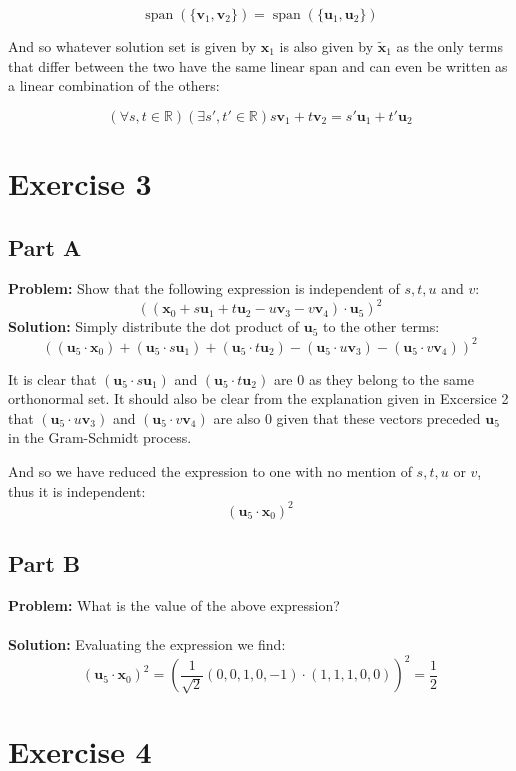 \documentclass{article}
\begin{document}
$$\operatorname{span}(\{\mathbf v_1,\mathbf v_2\})=\operatorname{span}(\{\mathbf u_1,\mathbf u_2\})$$

And so whatever solution set is given by $\mathbf x_1$ is also given by $\tilde{\mathbf x}_1$ as the only terms that differ between the two have the same linear span and can even be written as a linear combination of the others:

$$\left(\forall s,t\in\mathbb R\right)\left(\exists s',t'\in\mathbb R\right)s\mathbf v_1+t\mathbf v_2=s'\mathbf u_1+t'\mathbf u_2$$

\section*{Exercise 3}
\subsection*{Part A}
\textbf{Problem:} Show that the following expression is independent of $s,t,u$ and $v$:
$$((\mathbf x_0+s\mathbf u_1+t\mathbf u_2-u\mathbf v_3-v\mathbf v_4)\cdot\mathbf u_5)^2$$
\textbf{Solution:} Simply distribute the dot product of $\mathbf u_5$ to the other terms:
$$((\mathbf u_5\cdot\mathbf x_0)+(\mathbf u_5\cdot s\mathbf u_1)+(\mathbf u_5\cdot t\mathbf u_2)-(\mathbf u_5\cdot u\mathbf v_3)-(\mathbf u_5\cdot v\mathbf v_4))^2$$

It is clear that $(\mathbf u_5\cdot s\mathbf u_1)$ and $(\mathbf u_5\cdot t\mathbf u_2)$ are 0 as they belong to the same orthonormal set. It should also be clear from the explanation given in Excersice 2 that $(\mathbf u_5\cdot u\mathbf v_3)$ and $(\mathbf u_5\cdot v\mathbf v_4)$ are also 0 given that these vectors preceded $\mathbf u_5$ in the Gram-Schmidt process.

And so we have reduced the expression to one with no mention of $s,t,u$ or $v$, thus it is independent:
$$(\mathbf u_5\cdot\mathbf x_0)^2$$

\subsection*{Part B}
\textbf{Problem:} What is the value of the above expression?
\\\\
\textbf{Solution:} Evaluating the expression we find:
$$(\mathbf u_5\cdot\mathbf x_0)^2=\left(\frac{1}{\sqrt 2}(0,0,1,0,-1)\cdot(1,1,1,0,0)\right)^2=\frac{1}{2}$$

\section*{Exercise 4}
\end{document}
